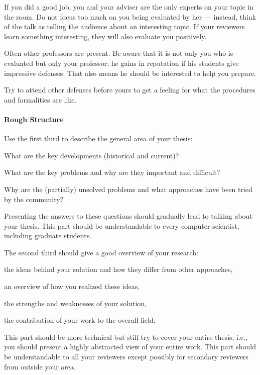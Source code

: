 \documentclass[12pt]{article}
\begin{document}
If you did a good job, you and your adviser are the only experts on your topic in the room.
Do not focus too much on you being evaluated by her --- instead, think of the talk as telling the audience about an interesting topic.
If your reviewers learn something interesting, they will also evaluate you positively. 
\medskip

Often other professors are present.
Be aware that it is not only you who is evaluated but only your professor: he gains in reputation if his students give impressive defenses.
That also means he should be interested to help you prepare. 
\medskip

Try to attend other defenses before yours to get a feeling for what the procedures and formalities are like.

\paragraph{Rough Structure}
Use the first third to describe the general area of your thesis:
\begin{compactitem}
 \item What are the key developments (historical and current)?
 \item What are the key problems and why are they important and difficult?
 \item Why are the (partially) unsolved problems and what approaches have been tried by the community?
\end{compactitem}
Presenting the answers to these questions should gradually lead to talking about your thesis.
This part should be understandable to every computer scientist, including graduate students.
\medskip

The second third should give a good overview of your research:
\begin{compactitem}
 \item the ideas behind your solution and how they differ from other approaches,
 \item an overview of how you realized these ideas,
 \item the strengths and weaknesses of your solution,
 \item the contribution of your work to the overall field.
\end{compactitem}
This part should be more technical but still try to cover your entire thesis, i.e., you should present a highly abstracted view of your entire work.
This part should be understandable to all your reviewers except possibly for secondary reviewers from outside your area.
\medskip
\end{document}
